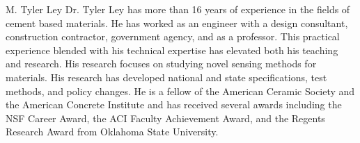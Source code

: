 \documentclass[journal]{IEEEtran}
\begin{document}
	\begin{IEEEbiography}{M. Tyler Ley}
		Dr. Tyler Ley has more than 16 years of experience in the fields of cement based materials.  He has worked as an engineer with a design consultant, construction contractor, government agency, and as a professor.  This practical experience blended with his technical expertise has elevated both his teaching and research.  His research focuses on studying novel sensing methods for materials.  His research has developed national and state specifications, test methods, and policy changes.  He is a fellow of the American Ceramic Society and the American Concrete Institute and has received several awards including the NSF Career Award, the ACI Faculty Achievement Award, and the Regents Research Award from Oklahoma State University.
	\end{IEEEbiography}
	
\end{document}
